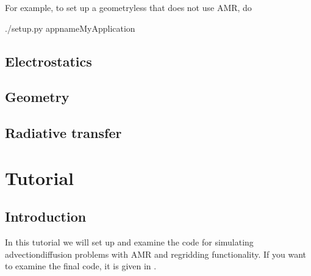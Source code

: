 \documentclass[letterpaper,10pt,english]{sphinxmanual}
\begin{document}
For example, to set up a geometry\sphinxhyphen{}less that does not use AMR, do

\begin{sphinxVerbatim}[commandchars=\\\{\},formatcom=\scriptsize]
 
./setup.py \PYGZhy{}app\PYGZus{}nameMyApplication
\end{sphinxVerbatim}


\section{Electrostatics}
\label{\detokenize{Applications/ElectrostaticsModel:electrostatics}}\label{\detokenize{Applications/ElectrostaticsModel:chap-electrostaticsmodel}}\label{\detokenize{Applications/ElectrostaticsModel::doc}}

\section{Geometry}
\label{\detokenize{Applications/GeometryModel:geometry}}\label{\detokenize{Applications/GeometryModel:chap-geometrymodel}}\label{\detokenize{Applications/GeometryModel::doc}}

\section{Radiative transfer}
\label{\detokenize{Applications/RadiativeTransferModel:radiative-transfer}}\label{\detokenize{Applications/RadiativeTransferModel:chap-radiativetransfermodel}}\label{\detokenize{Applications/RadiativeTransferModel::doc}}

\chapter{Tutorial}
\label{\detokenize{index:tutorial}}

\section{Introduction}
\label{\detokenize{Tutorials/Tutorial:introduction}}\label{\detokenize{Tutorials/Tutorial:chap-tutorial}}\label{\detokenize{Tutorials/Tutorial::doc}}
In this tutorial we will set up and examine the code for simulating advection\sphinxhyphen{}diffusion problems with AMR and regridding functionality.
If you want to examine the final code, it is given in .
\end{document}

